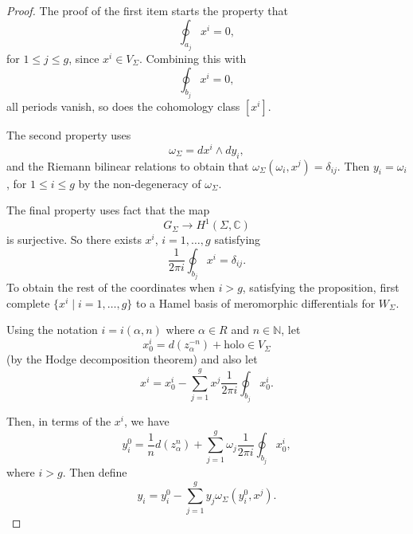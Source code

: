         \begin{proof}
        The proof of the first item starts the property that
        \[ \oint_{a_j}x^i=0,\] 
        for \(1 \leq j \leq g\), since \(x^i\in V_\Sigma\). Combining this with \[\oint_{b_j}x^i=0,\] 
        all periods vanish, so does the cohomology class \([x^i]\).
        
        The second property uses \[ \omega_\Sigma=dx^i\wedge dy_i,\] 
        and the Riemann bilinear relations to obtain that \(\omega_\Sigma(\omega_i,x^j)=\delta_{ij}\). Then \(y_i=\omega_i\), for \( 1 \leq i \leq g\) by the non-degeneracy of \(\omega_\Sigma\).

        The final property uses fact that the map 
        \[ G_\Sigma\to H^1(\Sigma, \mathbb{C})\] 
        is surjective. So there exists \(x^i\), \(i=1,\dots,g\) satisfying 
        \[\frac{1}{2\pi i}\oint_{b_j}x^i=\delta_{ij}.\] 
        To obtain the rest of the coordinates when \(i>g\), satisfying the proposition, first complete \( \{x^i\mid i=1,\dots,g\}\) to a Hamel basis of meromorphic differentials for \(W_\Sigma\).
        
        Using the notation \(i=i(\alpha,n)\) where \(\alpha\in R\) and \( n\in \mathbb{N}\), let \[x_0^i=d(z_{\alpha}^{-n})+ \text{holo} \in V_\Sigma\] 
        (by the Hodge decomposition theorem) and also let  
        \[ x^i=x_0^i-\sum_{j=1}^g x^j \frac{1}{2\pi i}\oint_{b_j}x_0^i. \]  
        
        Then, in terms of the \(x^i\), we have \[y_i^0=\frac{1}{n}d(z_\alpha^n)+\sum_{j=1}^g\omega_j\frac{1}{2\pi i}
        \oint_{b_j}x_0^i,\] 
        where \(i>g\). Then define \[y_i=y^0_i-\sum_{j=1}^gy_j\omega_\Sigma(y^0_i,x^j).\]
        \end{proof}

        

        

        

       
        
    
